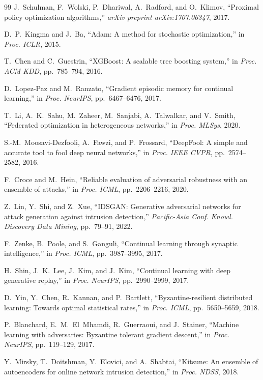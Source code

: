 \begin{thebibliography}{99}
J.~Schulman, F.~Wolski, P.~Dhariwal, A.~Radford, and O.~Klimov, ``Proximal policy optimization algorithms,'' \emph{arXiv preprint arXiv:1707.06347}, 2017.

D.~P.~Kingma and J.~Ba, ``Adam: A method for stochastic optimization,'' in \emph{Proc. ICLR}, 2015.

T.~Chen and C.~Guestrin, ``XGBoost: A scalable tree boosting system,'' in \emph{Proc. ACM KDD}, pp.~785--794, 2016.

D.~Lopez-Paz and M.~Ranzato, ``Gradient episodic memory for continual learning,'' in \emph{Proc. NeurIPS}, pp.~6467--6476, 2017.

T.~Li, A.~K.~Sahu, M.~Zaheer, M.~Sanjabi, A.~Talwalkar, and V.~Smith, ``Federated optimization in heterogeneous networks,'' in \emph{Proc. MLSys}, 2020.

S.-M.~Moosavi-Dezfooli, A.~Fawzi, and P.~Frossard, ``DeepFool: A simple and accurate tool to fool deep neural networks,'' in \emph{Proc. IEEE CVPR}, pp.~2574--2582, 2016.

F.~Croce and M.~Hein, ``Reliable evaluation of adversarial robustness with an ensemble of attacks,'' in \emph{Proc. ICML}, pp.~2206--2216, 2020.

Z.~Lin, Y.~Shi, and Z.~Xue, ``IDSGAN: Generative adversarial networks for attack generation against intrusion detection,'' \emph{Pacific-Asia Conf. Knowl. Discovery Data Mining}, pp.~79--91, 2022.

F.~Zenke, B.~Poole, and S.~Ganguli, ``Continual learning through synaptic intelligence,'' in \emph{Proc. ICML}, pp.~3987--3995, 2017.

H.~Shin, J.~K.~Lee, J.~Kim, and J.~Kim, ``Continual learning with deep generative replay,'' in \emph{Proc. NeurIPS}, pp.~2990--2999, 2017.

D.~Yin, Y.~Chen, R.~Kannan, and P.~Bartlett, ``Byzantine-resilient distributed learning: Towards optimal statistical rates,'' in \emph{Proc. ICML}, pp.~5650--5659, 2018.

P.~Blanchard, E.~M.~El~Mhamdi, R.~Guerraoui, and J.~Stainer, ``Machine learning with adversaries: Byzantine tolerant gradient descent,'' in \emph{Proc. NeurIPS}, pp.~119--129, 2017.

Y.~Mirsky, T.~Doitshman, Y.~Elovici, and A.~Shabtai, ``Kitsune: An ensemble of autoencoders for online network intrusion detection,'' in \emph{Proc. NDSS}, 2018.


\end{thebibliography}
